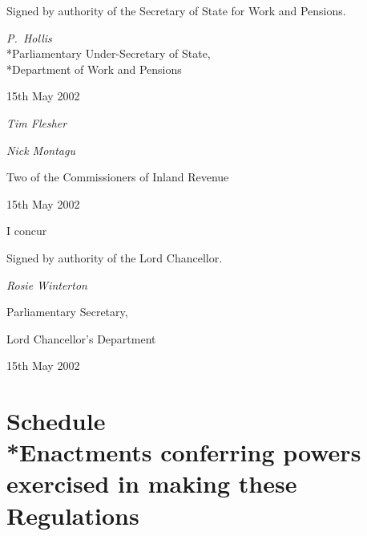 \documentclass[12pt,a4paper]{article}
\begin{document}
\bigskip

Signed 
by authority of the Secretary of State for Work and Pensions.

{\raggedleft
\emph{P.~Hollis}\\*Parliamentary Under-Secretary of State,\\*Department of Work and Pensions

}

15th May 2002

\bigskip

{\raggedleft
\emph{Tim Flesher}

\emph{Nick Montagu}

Two of the Commissioners of Inland Revenue

}

15th May 2002

\bigskip

I concur

Signed by authority of the Lord Chancellor.

{\raggedleft
\emph{Rosie Winterton}

Parliamentary Secretary,

Lord Chancellor’s Department

}

15th May 2002

\small

\part[Schedule --- Enactments conferring powers exercised in making these Regulations]{Schedule\\*Enactments conferring powers exercised in making these Regulations}
\end{document}
